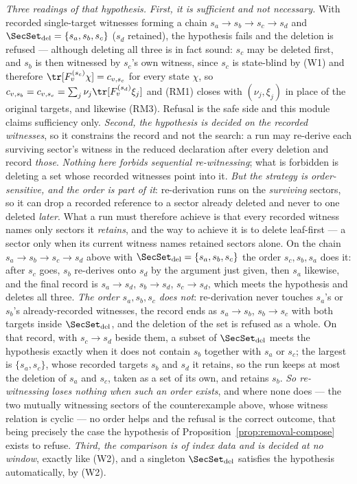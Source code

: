 \begin{remark}
\emph{Three readings of that hypothesis.} \emph{First, it is sufficient and
not necessary.} With
recorded single-target witnesses forming a chain
$s_a\to s_b\to s_c\to s_d$ and
$\SecSet_{\mathrm{del}}=\{s_a,s_b,s_c\}$ ($s_d$ retained), the hypothesis
fails and the deletion is refused --- although deleting all three is in
fact sound: $s_c$ may be deleted first, and $s_b$ is then witnessed by
$s_c$'s own witness, since $s_c$ is state-blind by (W1) and therefore
$\tr[F^{(s_c)}_v\chi]=c_{v,s_c}$ for every state $\chi$, so
$c_{v,s_b}=c_{v,s_c}=\sum_j\nu_j\tr[F^{(s_d)}_v\xi_j]$ and (RM1) closes
with $(\nu_j,\xi_j)$ in place of the original targets, and likewise
(RM3). Refusal is the safe side and this module claims sufficiency
only. \emph{Second, the hypothesis is decided on the \emph{recorded}
witnesses}, so it constrains the record and not the search: a run may
re-derive each surviving sector's witness in the reduced declaration after
every deletion and record \emph{those}. \emph{Nothing here forbids
sequential re-witnessing}; what is forbidden is deleting a set whose
recorded witnesses point into it. \emph{But the strategy is
order-sensitive, and the order is part of it}: re-derivation runs on the
\emph{surviving} sectors, so it can drop a recorded reference to a sector
already deleted and never to one deleted \emph{later}. What a run must
therefore achieve is that every recorded witness names only sectors it
\emph{retains}, and the way to achieve it is to delete leaf-first --- a
sector only when its current witness names retained sectors alone. On the
chain $s_a\to s_b\to s_c\to s_d$ above with
$\SecSet_{\mathrm{del}}=\{s_a,s_b,s_c\}$ the order $s_c,s_b,s_a$ does it:
after $s_c$ goes, $s_b$ re-derives onto $s_d$ by the argument just given,
then $s_a$ likewise, and the final record is
$s_a\to s_d$, $s_b\to s_d$, $s_c\to s_d$, which meets the hypothesis and
deletes all three. \emph{The order $s_a,s_b,s_c$ does not}: re-derivation
never touches $s_a$'s or $s_b$'s already-recorded witnesses, the record
ends as $s_a\to s_b$, $s_b\to s_c$ with both targets inside
$\SecSet_{\mathrm{del}}$, and the deletion of the set is refused as a
whole. On that record, with $s_c\to s_d$ beside them, a subset of
$\SecSet_{\mathrm{del}}$ meets the hypothesis exactly when it does not
contain $s_b$ together with $s_a$ or $s_c$; the largest is
$\{s_a,s_c\}$, whose recorded targets $s_b$ and $s_d$ it retains, so the
run keeps at most the deletion of $s_a$ and $s_c$, taken as a set of its
own, and retains $s_b$. \emph{So re-witnessing loses nothing
\emph{when such an order exists}}, and where none does --- the two
mutually witnessing sectors of the counterexample above, whose witness
relation is cyclic --- no order helps and the refusal is the correct
outcome, that being precisely the case the hypothesis of
Proposition~\ref{prop:removal-compose} exists to refuse. \emph{Third, the
comparison is of index data and is decided at no window}, exactly like
(W2), and a singleton $\SecSet_{\mathrm{del}}$ satisfies the hypothesis
automatically, by (W2).
\end{remark}
